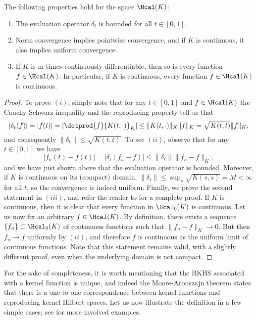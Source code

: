 \begin{proposition} The following properties hold for the space \(\Hcal(K)\):
  \begin{enumerate}
    \item The evaluation operator \(\delta_t\) is bounded for all \(t\in[0,1]\).
    \item Norm convergence implies pointwise convergence, and if \(K\) is continuous, it also implies uniform convergence.
    \item If \(K\) is m-times continuously differentiable, then so is every function \(f\in\Hcal(K)\). In particular, if \(K\) is continuous, every function \(f\in\Hcal(K)\) is continuous.
  \end{enumerate}
\end{proposition}
\begin{proof}
  To prove \((i)\), simply note that for any \(t\in[0,1]\) and \(f\in\Hcal(K)\) the Cauchy-Schwarz inequality and the reproducing property tell us that
  \[
  |\delta_t(f)| = |f(t)| = |\dotprod{f}{K(t, \cdot)}_K| \leq \|K(t, \cdot)\|_K \|f\|_K = \sqrt{K(t, t)}\|f\|_K,
  \]
  and consequently \(\|\delta_t\|\leq \sqrt{K(t, t)}\). To see \((ii)\), observe that for any \(t\in[0,1]\) we have
  \[
    |f_n(t) - f(t)| = |\delta_t(f_n - f)| \leq \|\delta_t\|\|f_n - f\|_K,
  \]
  and we have just shown above that the evaluation operator is bounded. Moreover, if \(K\) is continuous on its (compact) domain, \(\|\delta_t\| \leq \sup_s \sqrt{K(s, s)}=M<\infty\) for all \(t\), so the convergence is indeed uniform. Finally, we prove the second statement in \((iii)\), and refer the reader to \citet[][Th 2.6]{saitoh2016theory} for a complete proof. If \(K\) is continuous, then it is clear that every function in \(\Hcal_0(K)\) is continuous. Let us now fix an arbitrary \(f\in \Hcal(K)\). By definition, there exists a sequence \(\{f_n\}\subset \Hcal_0(K)\) of continuous functions such that \(\|f_n - f\|_K \to 0\). But then \(f_n \to f\) uniformly by \((ii)\), and therefore \(f\) is continuous as the uniform limit of continuous functions. Note that this statement remains valid, with a slightly different proof, even when the underlying domain is not compact.
\end{proof}

For the sake of completeness, it is worth mentioning that the RKHS associated with a kernel function is unique, and indeed the Moore-Aronszajn theorem \citep[e.g.][Th. 3]{berlinet2004reproducing} states that there is a one-to-one correspondence between kernel functions and reproducing kernel Hilbert spaces. Let us now illustrate the definition in a few simple cases; see \citet[][Ch.~1]{saitoh2016theory} for more involved examples.

